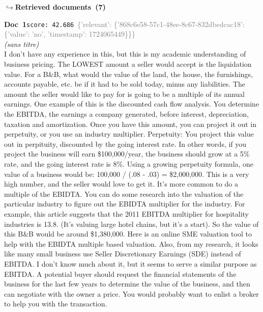 \documentclass[a4paper,11pt]{article}
\begin{document}
\noindent\hfill{\footnotesize\textcolor{doccolor}{\textbf{$\hookrightarrow$\enspace Retrieved documents~(7)}}}
\begin{docenv}
{\footnotesize\textcolor{doccolor}{\textbf{Doc~1}}}\hfill{\tiny\texttt{score:~42.686}}\ {\tiny\textcolor{gray}{\{'relevant': \{'868c6e58-57c1-48ee-8c67-832dbedcac18': \{'value': 'no', 'timestamp': 1724065449\}\}\}}}\\[3pt]
{\small\textit{(sans titre)}}\\[2pt]
\vspace{2pt}
{\footnotesize 
I don't have any experience in this, but this is my academic understanding of business pricing.  The LOWEST amount a seller would accept is the liquidation value. For a B\&B, what would the value of the land, the house, the furnishings, accounts payable, etc. be if it had to be sold today, minus any liabilities.  The amount the seller would like to pay for is going to be a multiple of its annual earnings. One example of this is the discounted cash flow analysis. You determine the EBITDA, the earnings a company generated, before interest,  depreciation, taxation and amortization.  Once you have this amount, you can project it out in perpetuity, or you use an industry multiplier.  Perpetuity:  You project this value out in perpituity, discounted by the going interest rate. In other words, if you project the business will earn \$100,000/year, the business should grow at a 5\% rate, and the going interest rate is 8\%. Using a growing perpetuity formula, one value of a business would be: 100,000 / (.08 - .03) = \$2,000,000.  This is a very high number, and the seller would love to get it.  It's more common to do a multiple of the EBIDTA. You can do some research into the valuation of the particular industry to figure out the EBIDTA multiplier for the industry. For example, this article suggests that the 2011 EBITDA multiplier for hospitality industries is 13.8. (It's valuing large hotel chains, but it's a start). So the value of this B\&B would be around \$1,380,000. Here is an online SME valuation tool to help with the EBIDTA multiple based valuation. Also, from my research, it looks like many small business use Seller Discretionary Earnings  (SDE) instead of EBITDA. I don't know much about it, but it seems to serve a similar purpose as EBITDA.  A potential buyer should request the financial statements of the business for the last few years to determine the value of the business, and then can negotiate with the owner a price. You would probably want to enlist a broker to help you with the transaction.}
\end{docenv}
\end{document}
